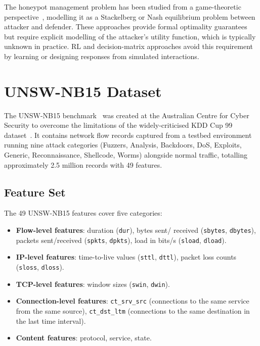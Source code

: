 The honeypot management problem has been studied from a game-theoretic
perspective~\citep{shi2021learning}, modelling it as a Stackelberg or
Nash equilibrium problem between attacker and defender.
These approaches provide formal optimality guarantees but require explicit
modelling of the attacker's utility function, which is typically unknown in
practice.
RL and decision-matrix approaches avoid this requirement by learning or
designing responses from simulated interactions.

\section{UNSW-NB15 Dataset}
\label{sec:bg_unsw}

The UNSW-NB15 benchmark~\citep{moustafa2015unsw} was created at the
Australian Centre for Cyber Security to overcome the limitations of the
widely-criticised KDD Cup 99 dataset~\citep{tavallaee2009detailed}.
It contains network flow records captured from a testbed environment running
nine attack categories (Fuzzers, Analysis, Backdoors, DoS, Exploits, Generic,
Reconnaissance, Shellcode, Worms) alongside normal traffic, totalling
approximately 2.5 million records with 49 features.

\subsection{Feature Set}

The 49 UNSW-NB15 features cover five categories:
%
\begin{itemize}
  \item \textbf{Flow-level features}: duration (\texttt{dur}), bytes sent/
        received (\texttt{sbytes}, \texttt{dbytes}), packets sent/received
        (\texttt{spkts}, \texttt{dpkts}), load in bits/s
        (\texttt{sload}, \texttt{dload}).
  \item \textbf{IP-level features}: time-to-live values
        (\texttt{sttl}, \texttt{dttl}), packet loss counts
        (\texttt{sloss}, \texttt{dloss}).
  \item \textbf{TCP-level features}: window sizes (\texttt{swin}, \texttt{dwin}).
  \item \textbf{Connection-level features}: \texttt{ct\_srv\_src}
        (connections to the same service from the same source),
        \texttt{ct\_dst\_ltm} (connections to the same destination in the
        last time interval).
  \item \textbf{Content features}: protocol, service, state.
\end{itemize}

